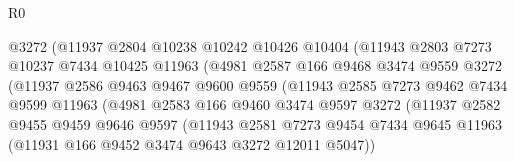 \begin{lexlean}{R0}
\begin{coremodule}
                                @3272
                                (@11937
                                  @2804
                                  @10238
                                  @10242
                                  @10426
                                  @10404
                                  (@11943
                                    @2803
                                    @7273
                                    @10237
                                    @7434
                                    @10425
                                    @11963
                                    (@4981
                                      @2587
                                      @166
                                      @9468
                                      @3474
                                      @9559
                                      @3272
                                      (@11937
                                        @2586
                                        @9463
                                        @9467
                                        @9600
                                        @9559
                                        (@11943
                                          @2585
                                          @7273
                                          @9462
                                          @7434
                                          @9599
                                          @11963
                                          (@4981
                                            @2583
                                            @166
                                            @9460
                                            @3474
                                            @9597
                                            @3272
                                            (@11937
                                              @2582
                                              @9455
                                              @9459
                                              @9646
                                              @9597
                                              (@11943
                                                @2581
                                                @7273
                                                @9454
                                                @7434
                                                @9645
                                                @11963
                                                (@11931 @166 @9452 @3474 @9643 @3272 @12011 @5047))

\end{coremodule}
\end{lexlean}
